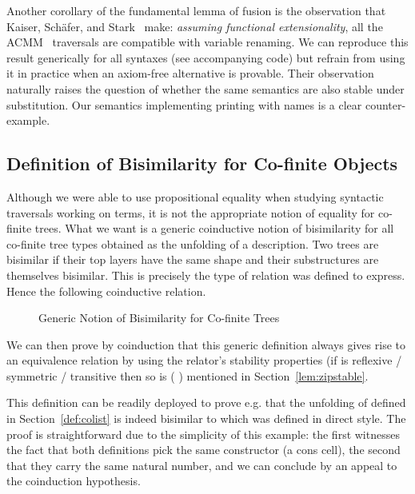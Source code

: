 {Another corollary of the fundamental lemma of fusion is the observation that
Kaiser, Schäfer, and Stark~\citeyear{Kaiser-wsdebr} make: \emph{assuming
functional extensionality}, all the ACMM~\citeyear{allais2017type} traversals
are compatible with variable renaming. We can reproduce this result generically
for all syntaxes (see accompanying code) but refrain from using it in practice
when an axiom-free alternative is provable. Their observation naturally raises
the question of whether the same semantics are also stable under substitution.
Our semantics implementing printing with names is a clear counter-example.



\subsection{Definition of Bisimilarity for Co-finite Objects}

Although we were able to use propositional equality when studying
syntactic traversals working on terms, it is not the appropriate
notion of equality for co-finite trees. What we want is a generic
coinductive notion of bisimilarity for all co-finite tree types
obtained as the unfolding of a description. Two trees are bisimilar
if their top layers have the same shape and their substructures are
themselves bisimilar. This is precisely the type of relation 
was defined to express. Hence the following coinductive relation.

\begin{figure}[h]
\caption{Generic Notion of Bisimilarity for Co-finite Trees}
\end{figure}

We can then prove by coinduction that this generic definition always gives
rise to an equivalence relation by using the relator's stability properties
(if  is reflexive / symmetric / transitive then so is {(   )}
mentioned in Section~\ref{lem:zipstable}.

\begin{center}
\end{center}

This definition can be readily deployed to prove e.g. that the unfolding
of  defined in Section~\ref{def:colist} is indeed bisimilar to 
which was defined in direct style. The proof is straightforward due to the simplicity
of this example: the first  witnesses the fact that both definitions
pick the same constructor (a cons cell), the second that they carry the
same natural number, and we can conclude by an appeal to the coinduction
hypothesis.

}
